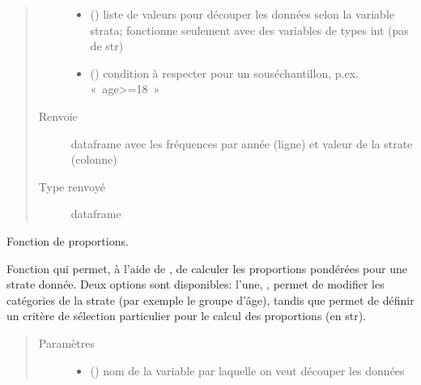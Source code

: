 \documentclass[letterpaper,10pt,french]{sphinxmanual}
\begin{document}
\begin{fulllineitems}
\begin{fulllineitems}
\begin{quote}
\begin{description}
\begin{itemize}
\item {} 
 () \textendash{} liste de valeurs pour découper les données selon la variable strata; fonctionne seulement avec des variables de types int (pas de str)

\item {} 
 () \textendash{} condition à respecter pour un sous\sphinxhyphen{}échantillon, p.ex. « age\textgreater{}=18 »

\end{itemize}

\item[{Renvoie}] \leavevmode
dataframe avec les fréquences par année (ligne) et valeur de la strate (colonne)

\item[{Type renvoyé}] \leavevmode
dataframe

\end{description}\end{quote}

\end{fulllineitems}


\begin{fulllineitems}
\label{\detokenize{code:simgen.replicate.prop}}
Fonction de proportions.

Fonction qui permet, à l’aide de , de calculer les proportions pondérées pour une strate donnée. Deux options sont disponibles: l’une, , permet de modifier les catégories de la strate (par exemple le groupe d’âge), tandis que  permet de définir un critère de sélection particulier pour le calcul des proportions (en str).
\begin{quote}\begin{description}
\item[{Paramètres}] \leavevmode\begin{itemize}
\item {} 
 () \textendash{} nom de la variable par laquelle on veut découper les données


\end{itemize}
\end{description}
\end{quote}
\end{fulllineitems}
\end{fulllineitems}
\end{document}
